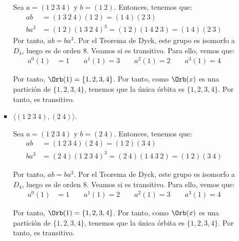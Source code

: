 \begin{ejercicio}
\begin{enumerate}
\begin{itemize}
\begin{itemize}
                Sea $a=(1\ 2\ 3\ 4)$ y $b=(1\ 2)$. Entonces, tenemos que:
                \begin{align*}
                    ab &= (1\ 3\ 2\ 4)(1\ 2) = (1\ 4)(2\ 3)\\
                    ba^3 &= (1\ 2)(1\ 3\ 2\ 4)^3
                    = (1\ 2)(1\ 4\ 2\ 3) = (1\ 4)(2\ 3)
                \end{align*}
                Por tanto, $ab=ba^3$. Por el Teorema de Dyck, este grupo es isomorfo a $D_4$, luego es de orden $8$. Veamos si es transitivo. Para ello, vemos que:
                \begin{align*}
                    a^0(1) &= 1 \qquad
                    a^1(1) = 3 \qquad
                    a^2(1) = 2 \qquad
                    a^3(1) = 4
                \end{align*}

                Por tanto, $\Orb(1)=\{1, 2, 3, 4\}$. Por tanto, como $\Orb(x)$ es una partición de $\{1, 2, 3, 4\}$, tenemos que la única órbita es $\{1, 2, 3, 4\}$. Por tanto, es transitivo.

                \item $\langle (1\ 2\ 3\ 4), (2\ 4)\rangle$.
                
                Sea $a=(1\ 2\ 3\ 4)$ y $b=(2\ 4)$. Entonces, tenemos que:
                \begin{align*}
                    ab &= (1\ 2\ 3\ 4)(2\ 4) = (1\ 2)(3\ 4)\\
                    ba^3 &= (2\ 4)(1\ 2\ 3\ 4)^3
                    = (2\ 4)(1\ 4\ 3\ 2) = (1\ 2)(3\ 4)
                \end{align*}

                Por tanto, $ab=ba^3$. Por el Teorema de Dyck, este grupo es isomorfo a $D_4$, luego es de orden $8$. Veamos si es transitivo. Para ello, vemos que:
                \begin{align*}
                    a^0(1) &= 1 \qquad
                    a^1(1) = 2 \qquad
                    a^2(1) = 3 \qquad
                    a^3(1) = 4
                \end{align*}

                Por tanto, $\Orb(1)=\{1, 2, 3, 4\}$. Por tanto, como $\Orb(x)$ es una partición de $\{1, 2, 3, 4\}$, tenemos que la única órbita es $\{1, 2, 3, 4\}$. Por tanto, es transitivo.
            \end{itemize}


\end{itemize}
\end{enumerate}
\end{ejercicio}
